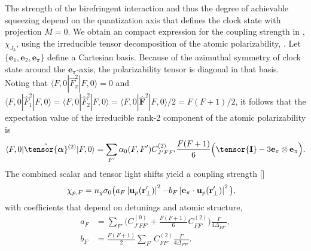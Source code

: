 \documentclass[preprint,aps,pra,onecolumn]{revtex4-1} %
\newcommand{\poltens}{\hat{\tensor{\boldsymbol{\alpha}}}}
\newcommand{\unittens}{\tensor{\mathbf{I}}}
\newcommand{\qaxis}{\mathbf{e}_\pi}
\newcommand{\error}[1]{{\color{red} #1}}
\begin{document}
The strength of the birefringent interaction and thus the degree of achievable squeezing depend on the quantization axis that defines the clock state with projection $M=0$.  
We obtain an compact expression for the coupling strength in , $\chi_{J_3}$, using the irreducible tensor decomposition of the atomic polarizability, .  
Let $\{\mathbf{e}_1,\mathbf{e}_2, \mathbf{e}_\pi\}$ define a Cartesian basis.  Because of the azimuthal symmetry of clock state around the $\qaxis$-axis, the polarizability tensor is diagonal in that basis.  
Noting that $\langle F,0 | \hat{F}_{\pi}^2| F,0 \rangle =0$ and $\langle F,0 | \hat{F}_{1}^2| F,0 \rangle = \langle F,0 | \hat{F}_{2}^2| F,0 \rangle = \langle F,0 | \hat{\mathbf{F}}^2| F,0 \rangle /2 =F(F+1)/2$, it follows that the expectation value of the irreducible rank-2 component of the atomic polarizability is
	\begin{align} \label{Eq::CouplingAngleMagic}
		\langle F,0 | \poltens \phantom{}^{(2)}| F,0 \rangle  %
		= \sum_{F'} \alpha_0(F,F') C^{(2)}_{J'FF'} \frac{F(F+1)}{6} \Big( \unittens - 3\qaxis \otimes \qaxis \Big).
	\end{align}
The combined scalar and tensor light shifts yield a coupling strength []
	\begin{align}
		\chi_{p,F} %
		&  = n_g \sigma_0 \big(  a_{F} \left|\mathbf{u}_p(\br'_\perp)\right|^2 \error{-} b_{F} \left|\mathbf{e}_\pi \cdot \mathbf{u}_p(\br'_\perp)\right|^2 \big), \label{Eq::ClockStateCoupling}
	\end{align}
with coefficients that depend on detunings and atomic structure,
	\begin{align}
		a_F &= \sum_{F'}  \Big(C^{(0)}_{J'FF'} + \frac{F(F+1)}{6} C^{(2)}_{FF'} \Big) \frac{\Gamma}{4 \Delta_{FF'}},\\
		b_F &= \frac{F(F+1)}{2}\sum_{F'} C^{(2)}_{FF'}  \frac{\Gamma}{4 \Delta_{FF'}}.
	\end{align}
\end{document}
